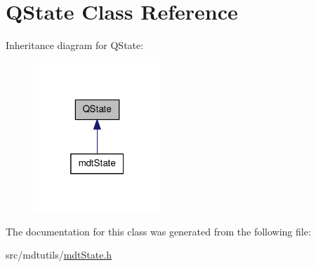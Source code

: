 \hypertarget{class_q_state}{\section{Q\-State Class Reference}
\label{class_q_state}
}


Inheritance diagram for Q\-State\-:
\nopagebreak
\begin{figure}[H]
\begin{center}
\leavevmode
\includegraphics[width=136pt]{class_q_state__inherit__graph}
\end{center}
\end{figure}


The documentation for this class was generated from the following file\-:\begin{DoxyCompactItemize}
\item 
src/mdtutils/\hyperlink{mdt_state_8h}{mdt\-State.\-h}\end{DoxyCompactItemize}
